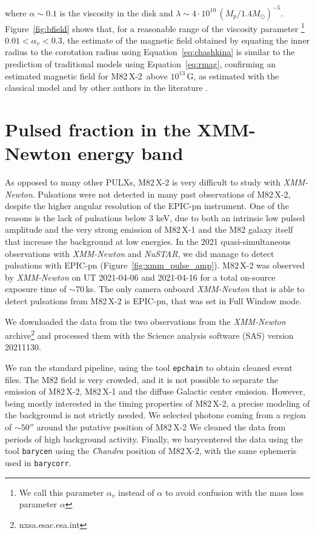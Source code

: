 \documentclass[twocolumn]{aastex631}
\newcommand{\chandra}{{\it Chandra}\xspace}
\newcommand{\xmm}{{\it XMM-Newton}\xspace}
\newcommand{\nustar}{\textit{NuSTAR}\xspace}
\newcommand{\Mone}{M82\,X-1\xspace}
\newcommand{\Mtwo}{M82\,X-2\xspace}
\newcommand{\msun}{\ensuremath{M_{\odot}}\xspace}
\newcommand{\figref}{Figure~\ref}
\begin{document}
where $\alpha\sim0.1$ is the viscosity in the disk and $\lambda\sim4\cdot10^{10}\,(M_p/1.4\msun)^{-5}$.
\figref{fig:bfield} shows that, for a reasonable range of the viscosity parameter
\footnote{We call this parameter $\alpha_v$ instead of $\alpha$ to avoid confusion with the mass loss parameter $\alpha$}
$0.01<\alpha_v<0.3$, the estimate of the magnetic field obtained by equating the inner radius to the corotation radius using Equation~\ref{eq:chashkina} is similar to the prediction of traditional models using Equation~\ref{eq:rmag}, confirming an estimated magnetic field for \Mtwo\ above $10^{13}$\,G, as estimated with the classical model and by other authors in the literature \citep{tsygankovPropellerEffectAction2016,chenStudyingMagneticFields2021}.

\section{Pulsed fraction in the XMM-Newton energy band}\label{sec:energy}

As opposed to many other PULXs, \Mtwo is very difficult to study with \xmm. Pulsations were not detected in many past observations of \Mtwo, despite the higher angular resolution of the EPIC-pn instrument.
One of the reasons is the lack of pulsations below 3 keV, due to both an intrinsic low pulsed amplitude and the very strong emission of \Mone and the M82 galaxy itself that increase the background at low energies.
In the 2021 quasi-simultaneous observations with \xmm and \nustar, we did manage to detect pulsations with EPIC-pn (\figref{fig:xmm_pulse_amp}).
\Mtwo was observed by \xmm on UT 2021-04-06 and 2021-04-16 for a total on-source exposure time of $\sim$70\,ks.
The only camera onboard \xmm that is able to detect pulsations from \Mtwo is EPIC-pn, that was set in Full Window mode.

We downloaded the data from the two observations from the \xmm archive\footnote{nxsa.esac.esa.int}
and processed them with the Science analysis software (SAS) version 20211130.

We ran the standard pipeline, using the tool \texttt{epchain} to obtain cleaned event files.
The M82 field is very crowded, and it is not possible to separate the emission of \Mtwo, \Mone and the diffuse Galactic center emission.
However, being mostly interested in the timing properties of \Mtwo, a precise modeling of the background is not strictly needed.
We selected photons coming from a region of $\sim50''$ around the putative position of \Mtwo
We cleaned the data from periods of high background activity.
Finally, we barycentered the data using the tool \texttt{barycen} using the \chandra position of \Mtwo, with the same ephemeris used in \texttt{barycorr}.
\end{document}
